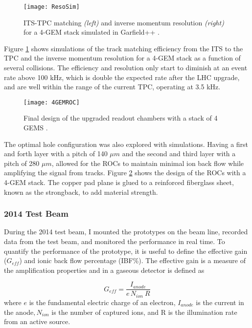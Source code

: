 \begin{figure}[b!]
\texttt{[image: ResoSim]}
\centering
\caption{ITS-TPC matching  \textit{(left)} and inverse momentum resolution \textit{(right)} for a 4-GEM stack simulated in Garfield++ \cite{Dick2017QM}. }
\label{fig:ResoSim}
\end{figure}


Figure \ref{fig:ResoSim} shows simulations of the track matching efficiency from the ITS to the TPC and the inverse momentum resolution for a 4-GEM stack as a function of several collisions.  The efficiency and resolution only start to diminish at an event rate above 100 kHz, which is double the expected rate after the LHC upgrade, and are well within the range of the current TPC, operating at 3.5 kHz.
 
\begin{figure}[h]
\texttt{[image: 4GEMROC]}
\centering
\caption{Final design of the upgraded readout chambers with a stack of 4 GEMS \cite{CERN-LHCC-2013-020}. }
\label{fig:4GEM}
\end{figure}

The optimal hole configuration was also explored with simulations.  Having a first and forth layer with a pitch of 140 $\mu m$ and the second and third layer with a pitch of 280 $\mu m$, allowed for the ROCs to maintain minimal ion back flow while amplifying the signal from tracks.  Figure \ref{fig:4GEM} shows the design of the ROCs with a 4-GEM stack.  The copper pad plane is glued to a reinforced fiberglass sheet, known as the strongback, to add material strength.

\subsubsection{2014 Test Beam}

During the 2014 test beam, I mounted the prototypes on the beam line, recorded data from the test beam, and monitored the performance in real time.  To quantify the performance of the prototype, it is useful to define the effective gain ($G_{eff}$) and ionic back flow percentage (IBF\%).  The effective gain is a measure of the amplification properties and in a gaseous detector is defined as

\begin{equation}
G_{eff}=\frac{I_{anode}}{\textit{e} \,  N_{ion} \ R}
\label{eq:gain}
\end{equation}
\noindent
where $\textit{e}$ is the fundamental electric charge of an electron, $I_{anode}$ is the current in the anode$, N_{ion}$ is the number of captured ions, and R is the illumination rate from an active source.

